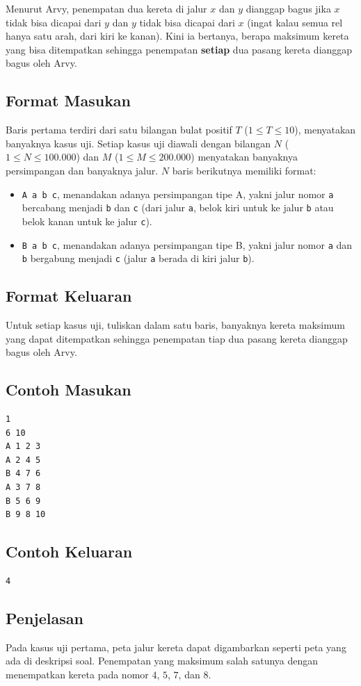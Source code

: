 \documentclass{article}
\begin{document}
Menurut Arvy, penempatan dua kereta di jalur $x$ dan $y$ dianggap bagus jika $x$ tidak bisa dicapai dari $y$ dan $y$ tidak bisa dicapai dari $x$ (ingat kalau semua rel hanya satu arah, dari kiri ke kanan).
Kini ia bertanya, berapa maksimum kereta yang bisa ditempatkan sehingga penempatan \textbf{setiap} dua pasang kereta dianggap bagus oleh Arvy.

\subsection*{Format Masukan}
Baris pertama terdiri dari satu bilangan bulat positif $T$ ($1 \leq T \leq 10$), menyatakan banyaknya kasus uji.
Setiap kasus uji diawali dengan bilangan $N$ ($1 \leq N \leq 100.000$) dan $M$ ($1 \leq M \leq 200.000$) menyatakan banyaknya persimpangan dan banyaknya jalur.
$N$ baris berikutnya memiliki format:
\begin{itemize}
    \setlength{\itemsep}{0pt}
    \item \lstinline{A a b c}, menandakan adanya persimpangan tipe A, yakni jalur nomor \lstinline{a} bercabang menjadi \lstinline{b} dan \lstinline{c} (dari jalur \lstinline{a}, belok kiri untuk ke jalur \lstinline{b} atau belok kanan untuk ke jalur \lstinline{c}).
    \item \lstinline{B a b c}, menandakan adanya persimpangan tipe B, yakni jalur nomor \lstinline{a} dan \lstinline{b} bergabung menjadi \lstinline{c} (jalur \lstinline{a} berada di kiri jalur \lstinline{b}).
\end{itemize}

\subsection*{Format Keluaran}
Untuk setiap kasus uji, tuliskan dalam satu baris, banyaknya kereta maksimum yang dapat ditempatkan sehingga penempatan tiap dua pasang kereta dianggap bagus oleh Arvy.

\pagebreak

\begin{multicols}{2}
\subsection*{Contoh Masukan}
\begin{lstlisting}
1
6 10
A 1 2 3
A 2 4 5
B 4 7 6
A 3 7 8
B 5 6 9
B 9 8 10
\end{lstlisting}
\columnbreak
\subsection*{Contoh Keluaran}
\begin{lstlisting}
4
\end{lstlisting}
\vfill
\null
\end{multicols}

\subsection*{Penjelasan}
Pada kasus uji pertama, peta jalur kereta dapat digambarkan seperti peta yang ada di deskripsi soal. Penempatan yang maksimum salah satunya dengan menempatkan kereta pada nomor $4$, $5$, $7$, dan $8$.
\end{document}
